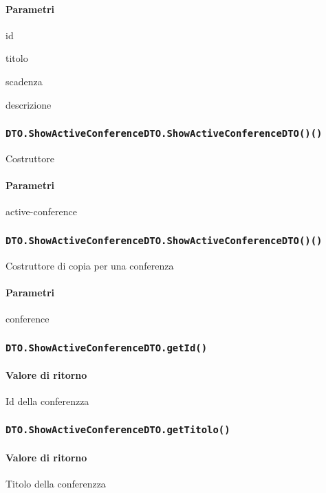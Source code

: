 \paragraph{Parametri}
\begin{description}
\item id
\item titolo
\item scadenza
\item descrizione
\end{description}
\subsubsection{\texttt{DTO.ShowActiveConferenceDTO.ShowActiveConferenceDTO()()}}
Costruttore
\paragraph{Parametri}
\begin{description}
\item active-conference
\end{description}
\subsubsection{\texttt{DTO.ShowActiveConferenceDTO.ShowActiveConferenceDTO()()}}
Costruttore di copia per una conferenza
\paragraph{Parametri}
\begin{description}
\item conference
\end{description}
\subsubsection{\texttt{DTO.ShowActiveConferenceDTO.getId()}}
\paragraph{Valore di ritorno}
\begin{description}
\item Id della conferenzza
\end{description}
\subsubsection{\texttt{DTO.ShowActiveConferenceDTO.getTitolo()}}
\paragraph{Valore di ritorno}
\begin{description}
\item Titolo della conferenzza
\end{description}
